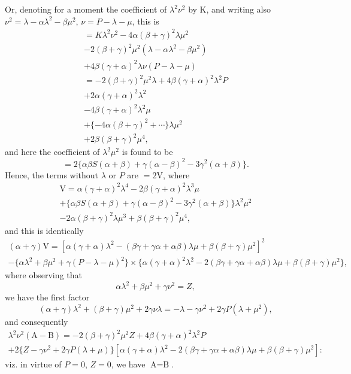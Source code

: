 \documentclass[11pt,a4paper]{book}
\begin{document}
Or, denoting for a moment the coefficient of $\lambda^{2}\nu^{2}$ by K, and writing also $\nu^{2} = \lambda - \alpha\lambda^{2} - \beta\mu^{2}$, $\nu = P - \lambda - \mu$, this is
%
\begin{multline}
= K\lambda^{2}\nu^{2} - 4\alpha(\beta + \gamma)^{2}\lambda\mu^{2} \\
- 2(\beta + \gamma)^{2}\mu^{2}(\lambda - \alpha\lambda^{2} - \beta\mu^{2}) \\
+ 4\beta(\gamma + \alpha)^{2}\lambda\nu(P - \lambda - \mu) \\
= -2(\beta + \gamma)^{2}\mu^{2}\lambda + 4\beta(\gamma + \alpha)^{2}\lambda^{2}P \\
+ 2\alpha(\gamma + \alpha)^{2}\lambda^{2} \\
- 4\beta(\gamma + \alpha)^{2}\lambda^{2}\mu \\
+ \{-4\alpha(\beta + \gamma)^{2} + \cdots\}\lambda\mu^{2} \\
+ 2\beta(\beta + \gamma)^{2}\mu^{4},
\end{multline}
%
and here the coefficient of $\lambda^{2}\mu^{2}$ is found to be
\[
= 2\{\alpha\beta S(\alpha + \beta) + \gamma(\alpha - \beta)^{2} - 3\gamma^{2}(\alpha + \beta)\}.
\]
Hence, the terms without $\lambda$ or $P$ are $= 2\text{V}$, where
%
\begin{multline}
\text{V} = \alpha(\gamma + \alpha)^{2}\lambda^{4} - 2\beta(\gamma + \alpha)^{2}\lambda^{3}\mu \\
+ \{\alpha\beta S(\alpha + \beta) + \gamma(\alpha - \beta)^{2} - 3\gamma^{2}(\alpha + \beta)\}\lambda^{2}\mu^{2} \\
- 2\alpha(\beta + \gamma)^{2}\lambda\mu^{3} + \beta(\beta + \gamma)^{2}\mu^{4},
\end{multline}
%
and this is identically
%
\begin{multline}
(\alpha + \gamma)\text{V} = [\alpha(\gamma + \alpha)\lambda^{2} - (\beta\gamma + \gamma\alpha + \alpha\beta)\lambda\mu + \beta(\beta + \gamma)\mu^{2}]^{2} \\
- \{\alpha\lambda^{2} + \beta\mu^{2} + \gamma(P - \lambda - \mu)^{2}\}\times\{
\alpha(\gamma + \alpha)^{2}\lambda^{2} - 2(\beta\gamma + \gamma\alpha + \alpha\beta)\lambda\mu + \beta(\beta + \gamma)\mu^{2}\},
\end{multline}
%
where observing that
\[
\alpha\lambda^{2} + \beta\mu^{2} + \gamma\nu^{2} = Z,
\]
we have the first factor
\[
(\alpha + \gamma)\lambda^{2} + (\beta + \gamma)\mu^{2} + 2\gamma\nu\lambda = -\lambda - \gamma\nu^{2} + 2\gamma P(\lambda + \mu^{2}),
\]
and consequently
%
\begin{multline}
\lambda^{2}\nu^{2}(\text{A} - \text{B}) = -2(\beta + \gamma)^{2}\mu^{2}Z + 4\beta(\gamma + \alpha)^{2}\lambda^{2}P \\
+ 2\{Z - \gamma\nu^{2} + 2\gamma P(\lambda + \mu)\}[\alpha(\gamma + \alpha)\lambda^{2} - 2(\beta\gamma + \gamma\alpha + \alpha\beta)\lambda\mu + \beta(\beta + \gamma)\mu^{2}]:
\end{multline}
%
viz. in virtue of $P=0$, $Z=0$, we have $\text{A} = \text{B}$.
\end{document}
